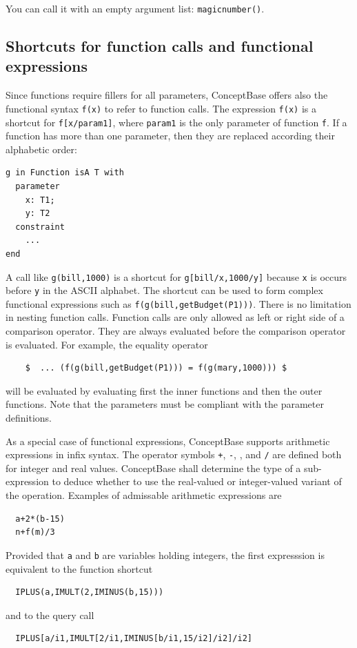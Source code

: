 You can call it with an empty argument list: {\tt magicnumber()}. 


\subsection{Shortcuts for function calls and functional expressions}

Since functions require  fillers for all parameters, ConceptBase offers also the functional syntax
{\tt f(x)} to refer to function calls. The expression {\tt f(x)} is a shortcut for {\tt f[x/param1]},
where {\tt param1} is the only parameter of function {\tt f}. If a function has more than one parameter,
then they are replaced according their alphabetic order:

\begin{verbatim}
g in Function isA T with
  parameter
    x: T1;
    y: T2
  constraint
    ...
end
\end{verbatim}

A call like {\tt g(bill,1000)} is a shortcut for {\tt g[bill/x,1000/y]} because {\tt x} is occurs before
{\tt y} in the ASCII alphabet.
The shortcut can be used to form complex functional expressions such as {\tt f(g(bill,getBudget(P1)))}. 
There is no limitation in nesting function calls. Function calls are only allowed as left or right side
of a comparison operator. They are always evaluated before the comparison operator is evaluated.
For example, the equality operator

\begin{verbatim}
    $  ... (f(g(bill,getBudget(P1))) = f(g(mary,1000))) $
\end{verbatim}

will be evaluated by evaluating first the inner functions and then the outer functions. Note that the
parameters must be compliant with the parameter definitions.


As a special case of functional expressions, ConceptBase supports arithmetic expressions in infix syntax.
The operator symbols {\tt +}, {\tt -}, {\tt *}, and {\tt /} are defined both for integer and
real values. ConceptBase shall determine the type of a sub-expression to deduce whether to use
the real-valued or integer-valued variant of the operation. Examples of admissable arithmetic expressions are

\begin{verbatim}
  a+2*(b-15)
  n+f(m)/3 
\end{verbatim}

Provided that {\tt a} and {\tt b} are variables holding integers, the first expresssion is equivalent to the function
shortcut
\begin{verbatim}
  IPLUS(a,IMULT(2,IMINUS(b,15)))
\end{verbatim}
and to the query call
\begin{verbatim}
  IPLUS[a/i1,IMULT[2/i1,IMINUS[b/i1,15/i2]/i2]/i2]
\end{verbatim}

